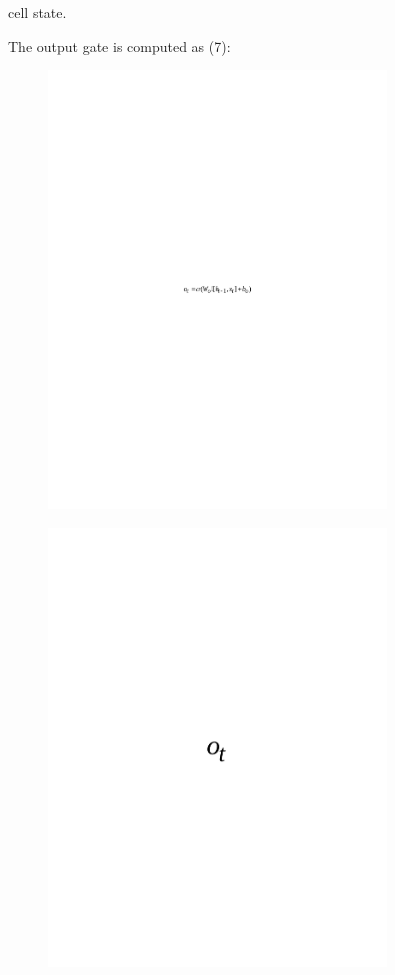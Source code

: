 cell state.

The output gate is computed as (7):

\begin{figure}[H]
	\centering
	\includegraphics[width=0.8\textwidth]{media/ict/image60}
	\caption*{}
\end{figure}


\begin{figure}[H]
	\centering
	\includegraphics[width=0.8\textwidth]{media/ict/image61}
	\caption*{}
\end{figure}

